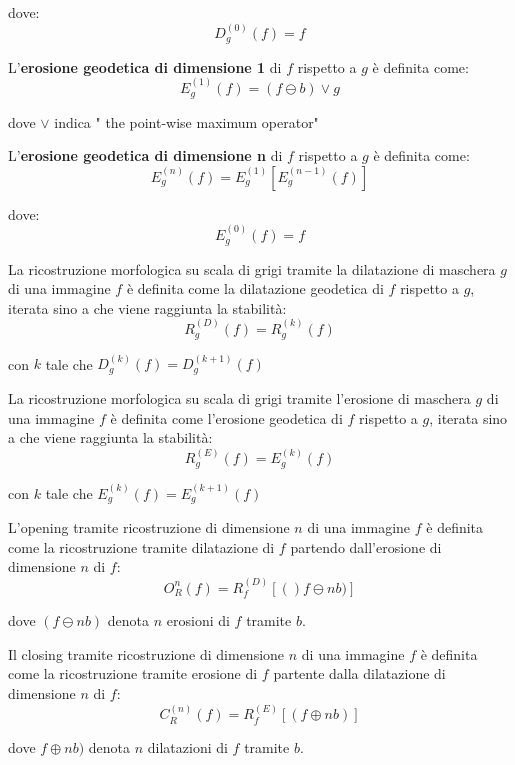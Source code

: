 dove:
$$
D_{g}^{(0)}(f) = f
$$

L'\textbf{erosione geodetica di dimensione 1} di $f$ rispetto a $g$ è definita come:
$$
E_g^{(1)}(f) = (f \ominus b) \vee g
$$

dove $\vee$ indica " the point-wise maximum operator"

L'\textbf{erosione geodetica di dimensione n} di $f$ rispetto a $g$ è definita come:
$$
E_g^{(n)}(f) = E_g^{(1)}[E_g^{(n-1)}(f)]
$$

dove:
$$
E_g^{(0)}(f) = f
$$

La ricostruzione morfologica su scala di grigi tramite la dilatazione di maschera $g$ di una immagine $f$ è definita come la dilatazione geodetica di $f$ rispetto a $g$, iterata sino a che viene raggiunta la stabilità:
$$
R_g^{(D)}(f) = R_g^{(k)}(f)
$$

con $k$ tale che $D_g^{(k)}(f) = D_g^{(k+1)}(f)$

La ricostruzione morfologica su scala di grigi tramite l'erosione di maschera $g$ di una immagine $f$ è definita come l'erosione geodetica di $f$ rispetto a $g$, iterata sino a che viene raggiunta la stabilità:
$$
R_g^{(E)}(f) = E_g^{(k)}(f)
$$

con $k$ tale che $E_g^{(k)}(f) = E_g^{(k+1)}(f)$

L'opening tramite ricostruzione di dimensione $n$ di una immagine $f$ è definita come la ricostruzione tramite dilatazione di $f$ partendo dall'erosione di dimensione $n$ di $f$:
$$
O_R^{n}(f) = R_f^{(D)}[()f \ominus nb)]
$$

dove $(f \ominus nb)$ denota $n$ erosioni di $f$ tramite $b$.

Il closing tramite ricostruzione di dimensione $n$ di una immagine $f$ è definita come la ricostruzione tramite erosione di $f$ partente dalla dilatazione di dimensione $n$ di $f$:
$$
C_R^{(n)}(f) = R_f^{(E)}[(f \oplus nb)]
$$

dove $f \oplus nb)$ denota $n$ dilatazioni di $f$ tramite $b$.